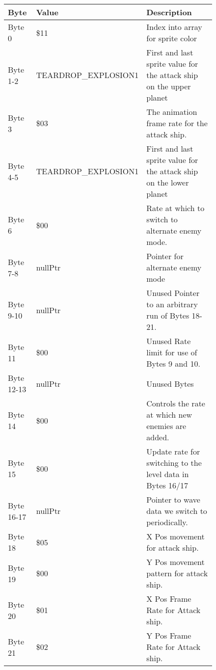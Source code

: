 \begin{figure}[H]
{\begin{adjustbox}{width=12cm}
\begin{tabular}{lll}
\toprule
 Byte       & Value                     & Description                                                         \\
\midrule
 Byte 0     & \$11                       & Index into array for sprite color                                   \\
 Byte 1-2   & TEARDROP\_EXPLOSION1       & First and last sprite value for the attack ship on the upper planet \\
 Byte 3     & \$03                       & The animation frame rate for the attack ship.                       \\
 Byte 4-5   & TEARDROP\_EXPLOSION1       & First and last sprite value for the attack ship on the lower planet \\
 Byte 6     & \$00                       & Rate at which to switch to alternate enemy mode.                    \\
 Byte 7-8   & nullPtr                   & Pointer for alternate enemy mode                                    \\
 Byte 9-10  & nullPtr                   & Unused Pointer to an arbitrary run of Bytes 18-21.                  \\
 Byte 11    & \$00                       & Unused Rate limit for use of Bytes 9 and 10.                        \\
 Byte 12-13 & nullPtr                   & Unused Bytes                                                        \\
 Byte 14    & \$00                       & Controls the rate at which new enemies are added.                   \\
 Byte 15    & \$00                       & Update rate for switching to the level data in Bytes 16/17          \\
 Byte 16-17 & nullPtr                   & Pointer to wave data we switch to periodically.                     \\
 Byte 18    & \$05                       & X Pos movement for attack ship.                                     \\
 Byte 19    & \$00                       & Y Pos movement pattern for attack ship.                             \\
 Byte 20    & \$01                       & X Pos Frame Rate for Attack ship.                                   \\
 Byte 21    & \$02                       & Y Pos Frame Rate for Attack ship.                                   \\

\end{tabular}
\end{adjustbox}}
\end{figure}

